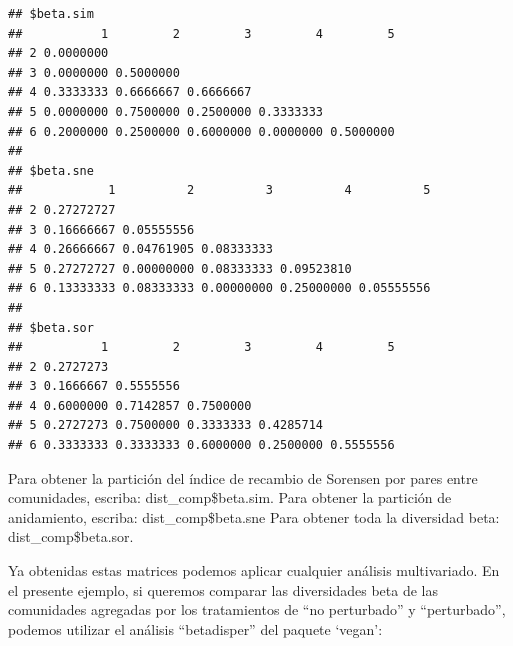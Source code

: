 \documentclass[
]{article}
\newenvironment{Shaded}{\begin{snugshade}}{\end{snugshade}}
\newcommand{\AttributeTok}[1]{\textcolor[rgb]{0.77,0.63,0.00}{#1}}
\newcommand{\DecValTok}[1]{\textcolor[rgb]{0.00,0.00,0.81}{#1}}
\newcommand{\FunctionTok}[1]{\textcolor[rgb]{0.00,0.00,0.00}{#1}}
\newcommand{\NormalTok}[1]{#1}
\newcommand{\OtherTok}[1]{\textcolor[rgb]{0.56,0.35,0.01}{#1}}
\newcommand{\SpecialCharTok}[1]{\textcolor[rgb]{0.00,0.00,0.00}{#1}}
\begin{document}
\begin{verbatim}
## $beta.sim
##           1         2         3         4         5
## 2 0.0000000                                        
## 3 0.0000000 0.5000000                              
## 4 0.3333333 0.6666667 0.6666667                    
## 5 0.0000000 0.7500000 0.2500000 0.3333333          
## 6 0.2000000 0.2500000 0.6000000 0.0000000 0.5000000
## 
## $beta.sne
##            1          2          3          4          5
## 2 0.27272727                                            
## 3 0.16666667 0.05555556                                 
## 4 0.26666667 0.04761905 0.08333333                      
## 5 0.27272727 0.00000000 0.08333333 0.09523810           
## 6 0.13333333 0.08333333 0.00000000 0.25000000 0.05555556
## 
## $beta.sor
##           1         2         3         4         5
## 2 0.2727273                                        
## 3 0.1666667 0.5555556                              
## 4 0.6000000 0.7142857 0.7500000                    
## 5 0.2727273 0.7500000 0.3333333 0.4285714          
## 6 0.3333333 0.3333333 0.6000000 0.2500000 0.5555556
\end{verbatim}

Para obtener la partición del índice de recambio de Sorensen por pares
entre comunidades, escriba: dist\_comp\$beta.sim. Para obtener la
partición de anidamiento, escriba: dist\_comp\$beta.sne Para obtener
toda la diversidad beta: dist\_comp\$beta.sor.

Ya obtenidas estas matrices podemos aplicar cualquier análisis
multivariado. En el presente ejemplo, si queremos comparar las
diversidades beta de las comunidades agregadas por los tratamientos de
``no perturbado'' y ``perturbado'', podemos utilizar el análisis
``betadisper'' del paquete `vegan':

\begin{Shaded}
\end{Shaded}
\end{document}
